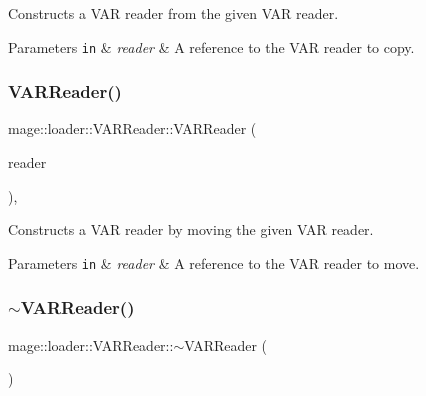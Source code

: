Constructs a V\+AR reader from the given V\+AR reader.


\begin{DoxyParams}[1]{Parameters}
\mbox{\tt in}  & {\em reader} & A reference to the V\+AR reader to copy. \\
\hline
\end{DoxyParams}
\hypertarget{classmage_1_1loader_1_1_v_a_r_reader_aeefac440730fc89b16afa19695c956d5}{}\label{classmage_1_1loader_1_1_v_a_r_reader_aeefac440730fc89b16afa19695c956d5} 
\subsubsection{\texorpdfstring{V\+A\+R\+Reader()}{VARReader()}\hspace{0.1cm}{\footnotesize\ttfamily [3/3]}}
{\footnotesize\ttfamily mage\+::loader\+::\+V\+A\+R\+Reader\+::\+V\+A\+R\+Reader (\begin{DoxyParamCaption}\item[{\hyperlink{classmage_1_1loader_1_1_v_a_r_reader}{V\+A\+R\+Reader} \&\&}]{reader }\end{DoxyParamCaption})\hspace{0.3cm}{\ttfamily [default]}, {\ttfamily [noexcept]}}

Constructs a V\+AR reader by moving the given V\+AR reader.


\begin{DoxyParams}[1]{Parameters}
\mbox{\tt in}  & {\em reader} & A reference to the V\+AR reader to move. \\
\hline
\end{DoxyParams}
\hypertarget{classmage_1_1loader_1_1_v_a_r_reader_acd3bbd51ccc774d2f74a4520b6143990}{}\label{classmage_1_1loader_1_1_v_a_r_reader_acd3bbd51ccc774d2f74a4520b6143990} 
\subsubsection{\texorpdfstring{$\sim$\+V\+A\+R\+Reader()}{~VARReader()}}
{\footnotesize\ttfamily mage\+::loader\+::\+V\+A\+R\+Reader\+::$\sim$\+V\+A\+R\+Reader (\begin{DoxyParamCaption}{ }\end{DoxyParamCaption})\hspace{0.3cm}{\ttfamily [default]}}

